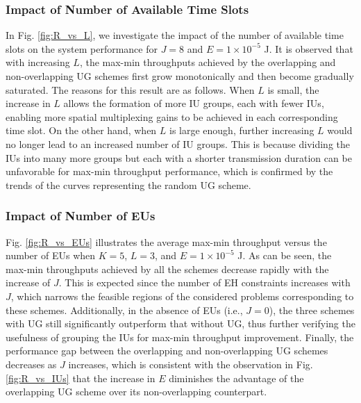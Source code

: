 \documentclass[12pt,draftclsnofoot, onecolumn]{IEEEtran}
\theoremstyle{plain}
\begin{document}
\begin{sloppypar}
\subsubsection{Impact of Number of Available Time Slots}

In Fig. \ref{fig:R_vs_L}, we investigate the impact of the number of available time slots on the system performance for $J = 8$ and $E = 1 \times 10^{-5}$ J. It is observed that with increasing $L$, the max-min throughputs achieved by the overlapping and non-overlapping UG schemes first grow monotonically and then become gradually saturated. The reasons for this result are as follows. When $L$ is small, the increase in $L$ allows the formation of more IU groups, each with fewer IUs, enabling more spatial multiplexing gains to be achieved in each corresponding time slot. On the other hand, when $L$ is large enough, further increasing $L$ would no longer lead to an increased number of IU groups. This is because dividing the IUs into many more groups but each with a shorter transmission duration can be unfavorable for max-min throughput performance, which is confirmed by the trends of the curves representing the random UG scheme. %

\subsubsection{Impact of Number of EUs}
Fig. \ref{fig:R_vs_EUs} illustrates the average max-min throughput versus the number of EUs when $K = 5$, $L = 3$, and $E = 1\times10^{-5}$ J. As can be seen, the max-min throughputs achieved by all the schemes decrease rapidly with the increase of $J$. This is expected since the number of EH constraints increases with $J$, which narrows the feasible regions of the considered problems corresponding to these schemes. Additionally, in the absence of EUs (i.e., $J = 0$), the three schemes with UG still significantly outperform that without UG, thus further verifying the usefulness of grouping the IUs for max-min throughput improvement. %
Finally, the performance gap between the overlapping and non-overlapping UG schemes decreases as $J$ increases, which is consistent with the observation in Fig. \ref{fig:R_vs_IUs} that the increase in $E$ diminishes the advantage of the overlapping UG scheme over its non-overlapping counterpart.   


\end{sloppypar}
\end{document}
